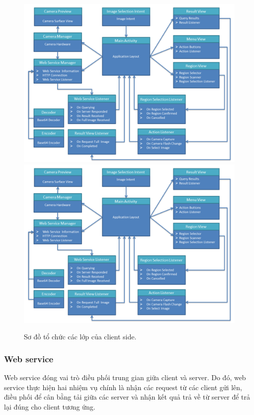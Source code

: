 \begin{figure}[!htbp]
  \begin{center}
    \leavevmode
    \ifpdf
      \includegraphics[scale=0.19]{client_framework}
    \else
      \includegraphics[scale=0.19]{client_framework}
    \fi
    \caption[Sơ đồ tổ chức các lớp của client side]{Sơ đồ tổ chức các lớp của client side.}
    \label{FigClientFramework}
  \end{center}
\end{figure}

\subsubsection{Web service}
Web service đóng vai trò điều phối trung gian giữa client và server. Do đó, web service thực hiện hai nhiệm vụ chính là nhận các request từ các client gửi lên, điều phối để cân bằng tải giữa các server và nhận kết quả trả về từ server để trả lại đúng cho client tương ứng.

